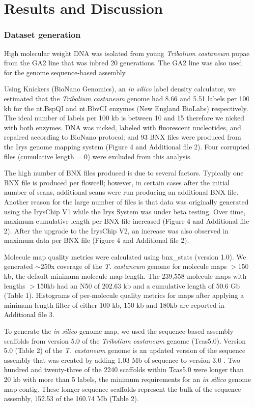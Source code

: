 \documentclass{bmcart}
\begin{document}
\section*{Results and Discussion}

\subsubsection*{Dataset generation}
High molecular weight DNA was isolated from young \textit{Tribolium castaneum} pupae from the GA2 line that was inbred 20 generations. The GA2 line was also used for the genome sequence-based assembly.

Using Knickers (BioNano Genomics), an \textit{in silico} label density calculator, we estimated that the \textit{Tribolium castaneum} genome had 8.66 and 5.51 labels per 100 kb for the nt.BspQI and nt.BbvCI enzymes (New England BioLabs) respectively. The ideal number of labels per 100 kb is between 10 and 15 therefore we nicked with both enzymes. DNA was nicked, labeled with fluorescent nucleotides, and repaired according to BioNano protocol; and 93 BNX files were produced from the Irys genome mapping system (Figure 4 and Additional file 2). Four corrupted files (cumulative length = 0) were excluded from this analysis. 

The high number of BNX files produced is due to several factors. Typically one BNX file is produced per flowcell; however, in certain cases after the initial number of scans, additional scans were run producing an additional BNX file. Another reason for the large number of files is that data was originally generated using the IrysChip\textregistered\textnormal{ }V1 while the Irys System was under beta testing. Over time, maximum cumulative length per BNX file increased (Figure 4 and Additional file 2). After the upgrade to the IrysChip V2, an increase was also observed in maximum data per BNX file (Figure 4 and Additional file 2).

Molecule map quality metrics were calculated using bnx\_stats (version 1.0). We generated $\sim$250x coverage of the \textit{T. castaneum} genome for molecule maps $>$150 kb, the default minimum molecule map length. The 239,558 molecule maps with lengths $>$150kb had an N50 of 202.63 kb and a cumulative length of 50.6 Gb (Table 1). Histograms of per-molecule quality metrics for maps after applying a minimum length filter of either 100 kb, 150 kb and 180kb are reported in Additional file 3. 

To generate the \textit{in silico} genome map, we used the sequence-based assembly scaffolds from version 5.0 of the \textit{Tribolium castaneum} genome (Tcas5.0). Version 5.0 (Table 2) of the \textit{T. castaneum} genome is an updated version of the sequence assembly that was created by adding 1.03 Mb of sequence to version 3.0 \cite{Beetle2008}. Two hundred and twenty-three of the 2240 scaffolds within Tcas5.0 were longer than 20 kb with more than 5 labels, the minimum requirements for an \textit{in silico} genome map contig. These longer sequence scaffolds represent the bulk of the sequence assembly, 152.53 of the 160.74 Mb (Table 2).
\end{document}
